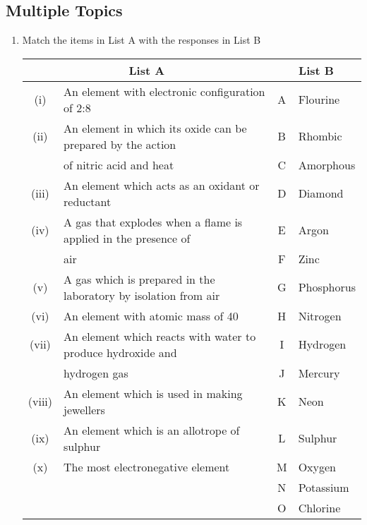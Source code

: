 \subsection{Multiple Topics}

\begin{enumerate}
	\item Match the items in List A with the responses in List B
	\begin{center}
		\begin{tabular}{|cp{9.5cm}|cp{2cm}|} \hline
			\multicolumn{2}{|c|}{List A} & \multicolumn{2}{|c|}{List B} \\ \hline
			(i) & An element with electronic configuration of 2:8 & A & Flourine \\
			(ii) & An element in which its oxide can be prepared by the action & B & Rhombic \\
			& of nitric acid and heat & C & Amorphous \\
			(iii) & An element which acts as an oxidant or reductant & D & Diamond \\
			(iv) & A gas that explodes when a flame is applied in the presence of & E & Argon \\
			& air & F & Zinc \\
			(v) & A gas which is prepared in the laboratory by isolation from air & G & Phosphorus \\
			(vi) & An element with atomic mass of 40 & H & Nitrogen \\
			(vii) & An element which reacts with water to produce hydroxide and & I & Hydrogen \\
			& hydrogen gas & J & Mercury \\
			(viii) & An element which is used in making jewellers & K & Neon \\
			(ix) & An element which is an allotrope of sulphur & L & Sulphur \\
			(x) & The most electronegative element & M & Oxygen \\
			& & N & Potassium \\
			& & O & Chlorine \\ \hline 
		\end{tabular}
	\end{center}
	

\end{enumerate}

